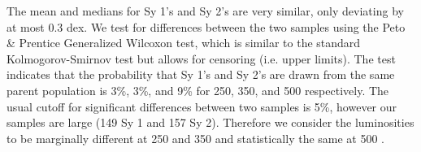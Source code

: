 The mean and medians for Sy 1's and Sy 2's are very similar, only deviating by at most 0.3 dex. We test for differences between the two samples using the Peto \& Prentice Generalized Wilcoxon test, which is similar to the standard Kolmogorov-Smirnov test but allows for censoring (i.e. upper limits). The test indicates that the probability that Sy 1's and Sy 2's are drawn from the same parent population is 3\%, 3\%, and 9\% for 250, 350, and 500 \um{} respectively. The usual cutoff for significant differences between two samples is 5\%, however our samples are large (149 Sy 1 and 157 Sy 2). Therefore we consider the luminosities to be marginally different at 250 and 350 \um{} and statistically the same at 500 \um.